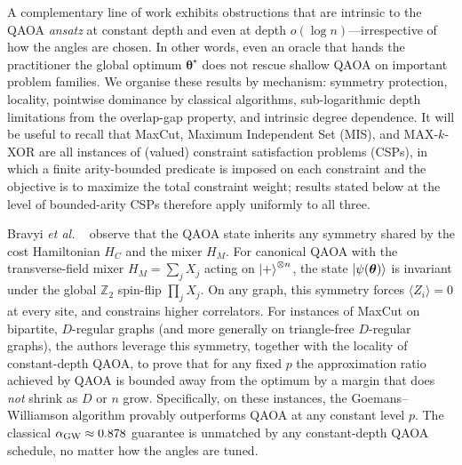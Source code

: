 \documentclass[twocolumn,
english,
aps,
pra,
10pt,
longbibliography,
superscriptaddress,
amsmath,
amssymb,
floatfix
]{revtex4-2}
\begin{document}
A complementary line of work exhibits obstructions that are intrinsic to the QAOA \emph{ansatz} at constant depth and even at depth $o(\log n)$---irrespective of how the angles are chosen.
In other words, even an oracle that hands the practitioner the global optimum $\boldsymbol{\theta}^\star$ does not rescue shallow QAOA on important problem families.
We organise these results by mechanism: symmetry protection, locality, pointwise dominance by classical algorithms, sub-logarithmic depth limitations from the overlap-gap property, and intrinsic degree dependence.
It will be useful to recall that MaxCut, Maximum Independent Set (MIS), and MAX-$k$-XOR are all instances of (valued) constraint satisfaction problems (CSPs), in which a finite arity-bounded predicate is imposed on each constraint and the objective is to maximize the total constraint weight; results stated below at the level of bounded-arity CSPs therefore apply uniformly to all three.

Bravyi \emph{et al.} ~\cite{Bravyi2020} observe that the QAOA state inherits any symmetry shared by the cost Hamiltonian $H_C$ and the mixer $H_M$.
For canonical QAOA with the transverse-field mixer $H_M=\sum_j X_j$ acting on $\ket{+}^{\otimes n}$, the state $\ket{\psi(\boldsymbol{\theta})}$ is invariant under the global $\mathbb{Z}_2$ spin-flip $\prod_j X_j$.
On any graph, this symmetry forces $\langle Z_i\rangle=0$ at every site, and constrains higher correlators.
For instances of MaxCut on bipartite, $D$-regular graphs (and more generally on triangle-free $D$-regular graphs), the authors leverage this symmetry, together with the locality of constant-depth QAOA, to prove that for any fixed $p$ the approximation ratio achieved by QAOA is bounded away from the optimum by a margin that does \emph{not} shrink as $D$ or $n$ grow.
Specifically, on these instances, the Goemans--Williamson algorithm provably outperforms QAOA at any constant level $p$.
The classical $\alpha_{\rm GW}\approx 0.878$ guarantee is unmatched by any constant-depth QAOA schedule, no matter how the angles are tuned.
\end{document}
